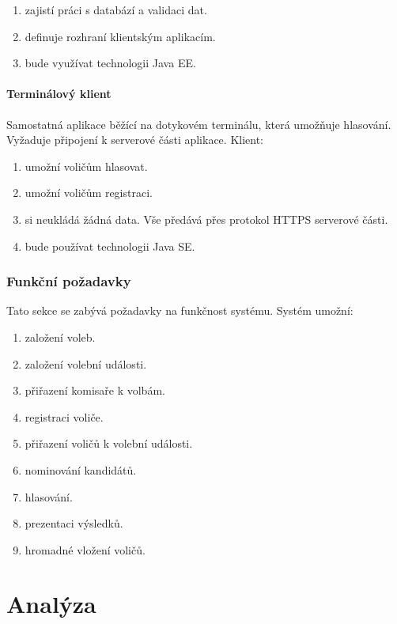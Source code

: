 \documentclass[11pt,twoside,a4paper]{book}
\begin{document}
\begin{enumerate}
	\item zajistí práci s databází a validaci dat.
	\item definuje rozhraní klientským aplikacím.
	\item bude využívat technologii Java EE.
\end{enumerate}

\subsubsection{Terminálový klient}

Samostatná aplikace běžící na dotykovém terminálu, která umožňuje hlasování. Vyžaduje připojení k serverové části aplikace. Klient:

\begin{enumerate}
	\item umožní voličům hlasovat.
	\item umožní voličům registraci.
	\item si neukládá žádná data. Vše předává přes protokol HTTPS serverové části. 
	\item bude používat technologii Java SE.
\end{enumerate}

\subsection{Funkční požadavky}

Tato sekce se zabývá požadavky na funkčnost systému. Systém umožní:

\begin{enumerate}
	\item založení voleb.
	\item založení volební události.
	\item přiřazení komisaře k volbám.
	\item registraci voliče.
	\item přiřazení voličů k volební události.
	\item nominování kandidátů.
	\item hlasování.
	\item prezentaci výsledků.
	\item hromadné vložení voličů.
\end{enumerate}

\chapter{Analýza} \label{sec:analyza}
\end{document}
